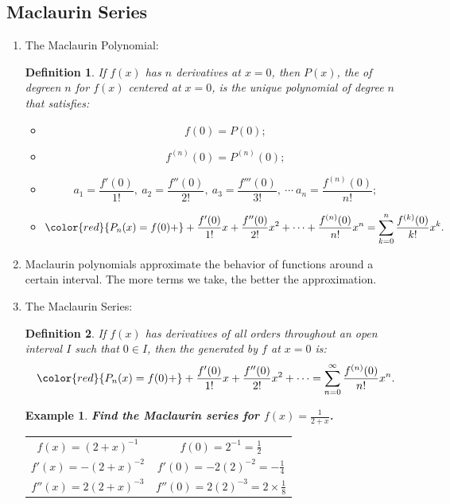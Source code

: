 \documentclass[12pt, a4paper]{article}
\newtheorem{definition}{Definition}[subsection]
\newtheorem{example}{Example}[subsection]
\begin{document}
\subsection{Maclaurin Series}
\begin{enumerate}
    \item The Maclaurin Polynomial: 
    \begin{definition}
        If $f(x)$ has $n$ derivatives at $x=0$, then $P(x)$, the \textbf{\color{red}{Maclaurin polynomial}} of degreen $n$ for $f(x)$ centered at $x=0$, is the unique polynomial of degree $n$ that satisfies: 
        \begin{itemize}
            \item $$f(0)=P(0);$$
            \item $$f^{(n)}(0)=P^{(n)}(0);$$
            \item $$a_1=\frac{f'(0)}{1!},\ a_2=\frac{f''(0)}{2!},\ a_3=\frac{f'''(0)}{3!},\ \cdots\ a_n=\frac{f^{(n)}(0)}{n!};$$
            \item $${\color{red}{P_n(x)=f(0)+}+\frac{f'(0)}{1!}x+\frac{f''(0)}{2!}x^2+\cdots+\frac{f^{(n)}(0)}{n!}x^n=\sum_{k=0}^n\frac{f^{(k)}(0)}{k!}x^k}.$$
        \end{itemize}
    \end{definition}
    \item Maclaurin polynomials approximate the behavior of functions around a certain interval. The more terms we take, the better the approximation.
    \item The Maclaurin Series: 
    \begin{definition}
        If $f(x)$ has derivatives of all orders throughout an open interval $I$ such that $0\in I$, then the \textbf{\color{red}{Maclaurin series}} generated by $f$ at $x=0$ is: 
        $${\color{red}{P_n(x)=f(0)+}+\frac{f'(0)}{1!}x+\frac{f''(0)}{2!}x^2+\cdots=\sum_{n=0}^\infty\frac{f^{(n)}(0)}{n!}x^n}.$$
    \end{definition}
    {\color{green}{A series converges when the sum of them is a constant (a limit can be found).}}
    \begin{example}
        \textbf{Find the Maclaurin series for $f(x)=\frac{1}{2+x}$.}
        \begin{center}\begin{tabular}{c|c} 
            $f(x)=(2+x)^{-1}$&$f(0)=2^{-1}=\frac{1}{2}$\\
            $f'(x)=-(2+x)^{-2}$&$f'(0)=-2(2)^{-2}=-\frac{1}{4}$\\
            $f''(x)=2(2+x)^{-3}$&$f''(0)=2(2)^{-3}=2\times\frac{1}{8}$\\

\end{tabular}
\end{center}
\end{example}
\end{enumerate}
\end{document}
